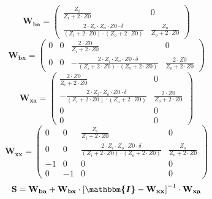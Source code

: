 \[ \mathbf{W_{ba}} = \left(\begin{smallmatrix} \frac{Z_i}{Z_i+2\cdot
Z0} & 0 \\ \frac{2\cdot Z_i\cdot Z_o\cdot Z0\cdot \delta}{ (Z_i+2\cdot
Z0 )\cdot (Z_o+2\cdot Z0 )} & \frac{Z_o}{Z_o+2\cdot Z0}
\end{smallmatrix}\right) \]
\[ \mathbf{W_{bx}} = \left(\begin{smallmatrix} 0 & 0 & \frac{2\cdot
Z0}{Z_i+2\cdot Z0} & 0 \\ 0 & 0 & -\frac{2\cdot Z_i\cdot Z_o\cdot
Z0\cdot \delta}{ (Z_i+2\cdot Z0 )\cdot (Z_o+2\cdot Z0 )} &
\frac{2\cdot Z0}{Z_o+2\cdot Z0} \end{smallmatrix}\right) \]
\[ \mathbf{W_{xa}} = \left(\begin{smallmatrix} \frac{2\cdot
Z0}{Z_i+2\cdot Z0} & 0 \\ -\frac{2\cdot Z_i\cdot Z_o\cdot Z0\cdot
\delta}{ (Z_i+2\cdot Z0 )\cdot (Z_o+2\cdot Z0 )} & \frac{2\cdot
Z0}{Z_o+2\cdot Z0} \\ 0 & 0 \\ 0 & 0 \end{smallmatrix}\right) \]
\[ \mathbf{W_{xx}} = \left(\begin{smallmatrix} 0 & 0 &
\frac{Z_i}{Z_i+2\cdot Z0} & 0 \\ 0 & 0 & \frac{2\cdot Z_i\cdot
Z_o\cdot Z0\cdot \delta}{ (Z_i+2\cdot Z0 )\cdot (Z_o+2\cdot Z0 )} &
\frac{Z_o}{Z_o+2\cdot Z0} \\ -1 & 0 & 0 & 0 \\ 0 & -1 & 0 & 0
\end{smallmatrix}\right) \]
\[ \mathbf{S}=\mathbf{W_{ba}}+\mathbf{W_{bx}}\cdot\left[
\boldsymbol{\mathbbm{I}}
-\mathbf{W_{xx}}\right]^{-1}\cdot\mathbf{W_{xa}} \]
